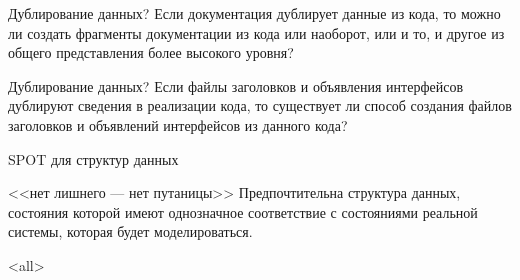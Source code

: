 \begin{frame}{Дублирование данных?}
Если документация дублирует данные из кода,  то можно ли создать фрагменты документации 
из кода или наоборот,  или и то,  и другое из общего представления более высокого уровня?
\end{frame}

\begin{frame}{Дублирование данных?}
	Если файлы заголовков и объявления интерфейсов дублируют сведения в реализации кода,  
	то существует ли способ создания файлов заголовков и объявлений интерфейсов из данного кода?
\end{frame}

\begin{frame}{SPOT для структур данных}
	\begin{block}{<<нет лишнего — нет путаницы>>}
		Предпочтительна структура данных,  состояния которой имеют однозначное 
		соответствие с состояниями реальной системы,  которая будет моделироваться.
	\end{block}
\end{frame}

\mode<all>{}


